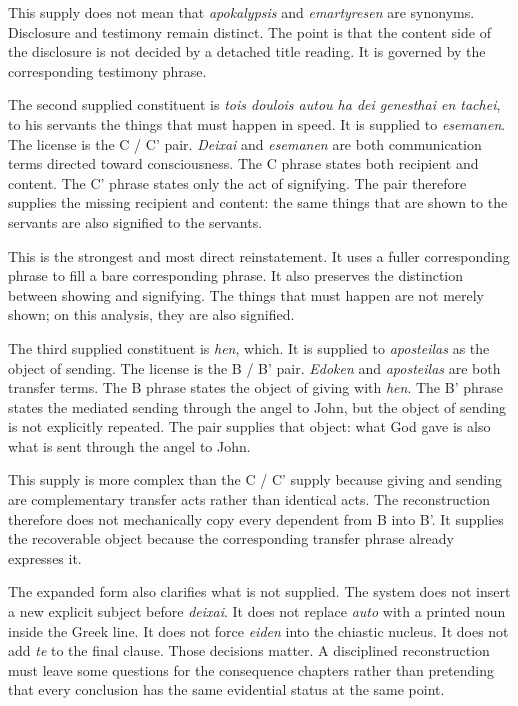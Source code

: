 This supply does not mean that \textit{apokalypsis} and \textit{emartyresen} are synonyms. Disclosure and testimony remain distinct. The point is that the content side of the disclosure is not decided by a detached title reading. It is governed by the corresponding testimony phrase.

The second supplied constituent is \textit{tois doulois autou ha dei genesthai en tachei}, to his servants the things that must happen in speed. It is supplied to \textit{esemanen}. The license is the C / C' pair. \textit{Deixai} and \textit{esemanen} are both communication terms directed toward consciousness. The C phrase states both recipient and content. The C' phrase states only the act of signifying. The pair therefore supplies the missing recipient and content: the same things that are shown to the servants are also signified to the servants.

This is the strongest and most direct reinstatement. It uses a fuller corresponding phrase to fill a bare corresponding phrase. It also preserves the distinction between showing and signifying. The things that must happen are not merely shown; on this analysis, they are also signified.

The third supplied constituent is \textit{hen}, which. It is supplied to \textit{aposteilas} as the object of sending. The license is the B / B' pair. \textit{Edoken} and \textit{aposteilas} are both transfer terms. The B phrase states the object of giving with \textit{hen}. The B' phrase states the mediated sending through the angel to John, but the object of sending is not explicitly repeated. The pair supplies that object: what God gave is also what is sent through the angel to John.

This supply is more complex than the C / C' supply because giving and sending are complementary transfer acts rather than identical acts. The reconstruction therefore does not mechanically copy every dependent from B into B'. It supplies the recoverable object because the corresponding transfer phrase already expresses it.

The expanded form also clarifies what is not supplied. The system does not insert a new explicit subject before \textit{deixai}. It does not replace \textit{auto} with a printed noun inside the Greek line. It does not force \textit{eiden} into the chiastic nucleus. It does not add \textit{te} to the final clause. Those decisions matter. A disciplined reconstruction must leave some questions for the consequence chapters rather than pretending that every conclusion has the same evidential status at the same point.

